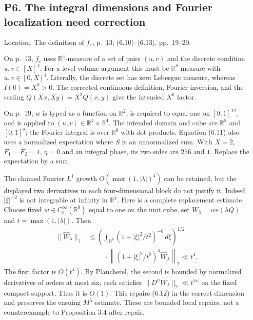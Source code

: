 \documentclass[10pt]{article}
\begin{document}
\subsection*{P6. The integral dimensions and Fourier localization need correction}
Location. The definition of \(f_\varepsilon\), p. 13; (6.10)–(6.13), pp. 19–20.\par
On p. 13, \(f_\varepsilon\) uses \(\mathbb R^4\)-measure of a set of pairs \((u,v)\) and the discrete condition \(u,v\in[X]^4\). For a level-volume argument this must be \(\mathbb R^8\)-measure with \(u,v\in[0,X]^4\). Literally, the discrete set has zero Lebesgue measure, whereas \(I(0)=X^8>0\). The corrected continuous definition, Fourier inversion, and the scaling \(Q(Xx,Xy)=X^2Q(x,y)\) give the intended \(X^6\) factor.\par
On p. 19, \(w\) is typed as a function on \(\mathbb R^2\), is required to equal one on \([0,1]^{12}\), and is applied to \((u,v)\in\mathbb R^4\times\mathbb R^4\). The intended domain and cube are \(\mathbb R^8\) and \([0,1]^8\); the Fourier integral is over \(\mathbb R^8\) with dot products. Equation (6.11) also uses a normalized expectation where \(S\) is an unnormalized sum. With \(X=2\), \(F_1=F_2=1\), \(\eta=0\) and an integral phase, its two sides are \(256\) and \(1\). Replace the expectation by a sum.\par
The claimed Fourier \(L^1\) growth \(O(\max(1,|\lambda|)^4)\) can be retained, but the displayed two derivatives in each four-dimensional block do not justify it. Indeed \(|\xi|^{-2}\) is not integrable at infinity in \(\mathbb R^4\). Here is a complete replacement estimate. Choose fixed \(w\in C_c^\infty(\mathbb R^8)\) equal to one on the unit cube, set \(W_\lambda=w e(\lambda Q)\) and \(t=\max(1,|\lambda|)\). Then \[\begin{split}
 \|\widehat W_\lambda\|_1
 &\le
 \left(\int_{\mathbb R^8}(1+|\xi|^2/t^2)^{-6}\,d\xi\right)^{1/2}\\
 &\hspace{1cm}\cdot
 \left\|(1+|\xi|^2/t^2)^3\widehat W_\lambda\right\|_2
 \ll t^4.
 \end{split}
 \tag{R9}\] The first factor is \(O(t^4)\). By Plancherel, the second is bounded by normalized derivatives of orders at most six; each satisfies \(\|D^\alpha W_\lambda\|_2\ll t^{|\alpha|}\) on the fixed compact support. Thus it is \(O(1)\). This repairs (6.12) in the correct dimension and preserves the ensuing \(M^5\) estimate. These are bounded local repairs, not a counterexample to Proposition 3.4 after repair.\par
\end{document}
